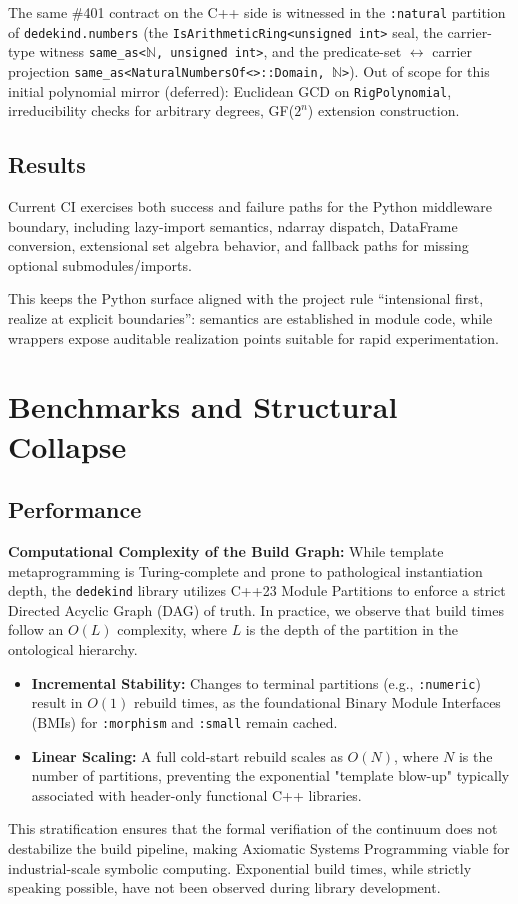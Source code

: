 \documentclass[11pt, a4paper]{report}
\begin{document}
The same \#401 contract on the C++ side is witnessed in the \texttt{:natural} partition of \texttt{dedekind.numbers} (the \texttt{IsArithmeticRing<unsigned int>} seal, the carrier-type witness \texttt{same\_as<$\mathbb{N}$, unsigned int>}, and the predicate-set $\leftrightarrow$ carrier projection \texttt{same\_as<NaturalNumbersOf<>::Domain, $\mathbb{N}$>}). Out of scope for this initial polynomial mirror (deferred): Euclidean GCD on \texttt{RigPolynomial}, irreducibility checks for arbitrary degrees, GF($2^n$) extension construction.

\section{Results}

Current CI exercises both success and failure paths for the Python middleware boundary, including lazy-import semantics, ndarray dispatch, DataFrame conversion, extensional set algebra behavior, and fallback paths for missing optional submodules/imports.

This keeps the Python surface aligned with the project rule \enquote{intensional first, realize at explicit boundaries}: semantics are established in module code, while wrappers expose auditable realization points suitable for rapid experimentation.


\chapter{Benchmarks and Structural Collapse}
\label{chap:benchmarks}

\section{Performance}

\textbf{Computational Complexity of the Build Graph:} While template metaprogramming is Turing-complete and prone to pathological instantiation depth, the \texttt{dedekind} library utilizes C++23 Module Partitions to enforce a strict Directed Acyclic Graph (DAG) of truth. 
In practice, we observe that build times follow an $O(L)$ complexity, where $L$ is the depth of the partition in the ontological hierarchy. 

\begin{itemize}
    \item \textbf{Incremental Stability:} Changes to terminal partitions (e.g., \texttt{:numeric}) result in $O(1)$ rebuild times, as the foundational Binary Module Interfaces (BMIs) for \texttt{:morphism} and \texttt{:small} remain cached.
    \item \textbf{Linear Scaling:} A full cold-start rebuild scales as $O(N)$, where $N$ is the number of partitions, preventing the exponential "template blow-up" typically associated with header-only functional C++ libraries.
\end{itemize}
This stratification ensures that the formal verifiation of the continuum does not destabilize the build pipeline, making Axiomatic Systems Programming viable for industrial-scale symbolic computing.
Exponential build times, while strictly speaking possible, have not been observed during library development.
\end{document}
